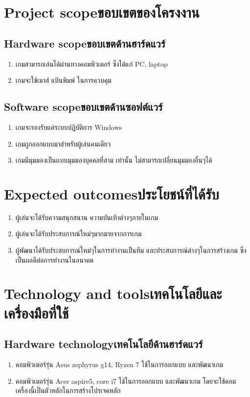 \section{\ifenglish Project scope\else ขอบเขตของโครงงาน\fi}

\subsection{\ifenglish Hardware scope\else ขอบเขตด้านฮาร์ดแวร์\fi}
\begin{enumerate}
    \item เกมสามารถเล่นได้ผ่านทางคอมพิวเตอร์ ซึ่งได้แก่ PC, laptop
    \item เกมจะใช้เมาส์ แป้นพิมพ์ ในการควบคุม
\end{enumerate}
\subsection{\ifenglish Software scope\else ขอบเขตด้านซอฟต์แวร์\fi}
\begin{enumerate}
    \item เกมจะรองรับแค่ระบบปฏิบัติการ Windows
    \item เกมถูกออกแบบมาสำหรับผู้เล่นคนเดียว
    \item เกมมีมุมมองเป็นเเบบมุมมองบุคคลที่สาม เท่านั้น ไม่สามารถเปลี่ยนมุมมองอื่นๆได้
\end{enumerate}
\section{\ifenglish Expected outcomes\else ประโยชน์ที่ได้รับ\fi}
\begin{enumerate}
    \item ผู้เล่นจะได้รับความสนุกสนาน ความบันเทิงต่างๆภายในเกม
    \item ผู้เล่นจะได้รับประสบการณ์ใหม่ๆมากมายจากการเกม
    \item ผู้พัฒนาได้รับประสบการณ์ใหม่ๆในการทำงานเป็นทีม และประสบการณ์ต่างๆในการสร้างเกม ซึ่งเป็นผลดีต่อการทำงานในอนาคต
\end{enumerate}
\section{\ifenglish Technology and tools\else เทคโนโลยีและเครื่องมือที่ใช้\fi}

\subsection{\ifenglish Hardware technology\else เทคโนโลยีด้านฮาร์ดแวร์\fi}
\begin{enumerate}
    \item คอมพิวเตอร์รุ่น Asus zephyrus g14, Ryzen 7 ใช้ในการออกแบบ และพัฒนาเกม
    \item คอมพิวเตอร์รุ่น Acer aspire5, core i7 ใช้ในการออกแบบ และพัฒนาเกม โดยจะใช้คอมเครื่องนี้เป็นตัวหลักในการสร้างโปรเจคหลัก
\end{enumerate}
